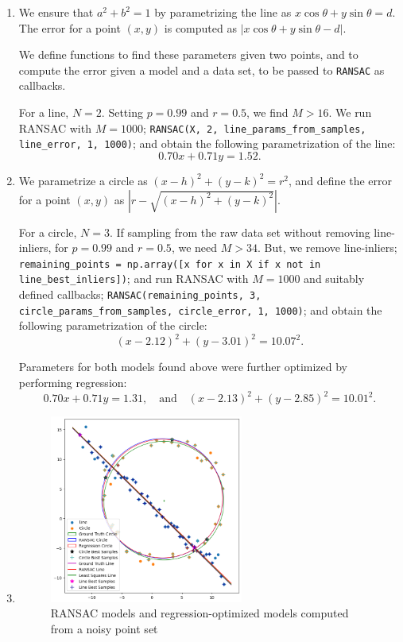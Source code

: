 \documentclass{article}[a4paper]
\begin{document}
	\begin{enumerate}
		\item We ensure that $a^2 + b^2 = 1$ by parametrizing the line as $x\cos\theta + y\sin\theta = d$. The error for a point $(x, y)$ is computed as $|x\cos\theta + y\sin\theta - d|$.
		
		We define functions to find these parameters given two points, and to compute the error given a model and a data set, to be passed to \lstinline|RANSAC| as callbacks.
		
		For a line, $N=2$. Setting $p=0.99$ and $r=0.5$, we find $M>16$. We run RANSAC with $M=1000$; \lstinline|RANSAC(X, 2, line_params_from_samples, line_error, 1, 1000)|; and obtain the following parametrization of the line: \[
			0.70x + 0.71y = 1.52.
		\]

		\item We parametrize a circle as $(x - h)^2 + (y - k)^2 = r^2$, and define the error for a point $(x, y)$ as $\left|r - \sqrt{\left(x - h\right)^2 + \left(y - k\right)^2}\right|$.
		
		For a circle, $N=3$. If sampling from the raw data set without removing line-inliers, for $p=0.99$ and $r=0.5$, we need $M>34$. But, we remove line-inliers; \lstinline|remaining_points = np.array([x for x in X if x not in line_best_inliers])|; and run RANSAC with $M=1000$ and suitably defined callbacks; \lstinline|RANSAC(remaining_points, 3, circle_params_from_samples, circle_error, 1, 1000)|; and obtain the following parametrization of the circle: \[
			(x - 2.12)^2 + (y - 3.01)^2 = 10.07^2.
		\]
		
		Parameters for both models found above were further optimized by performing regression: \[
			0.70x + 0.71y = 1.31, \quad\text{and}\quad (x - 2.13)^2 + (y - 2.85)^2 = 10.01^2.
		\]

		\item \phantom{a}
		\begin{figure}[H]
			\centering
			\includegraphics[width=0.6\textwidth]{imgs/q2graph.png}
			\caption{RANSAC models and regression-optimized models computed from a noisy point set}
			\label{q2graph}
		\end{figure}


\end{enumerate}
\end{document}
